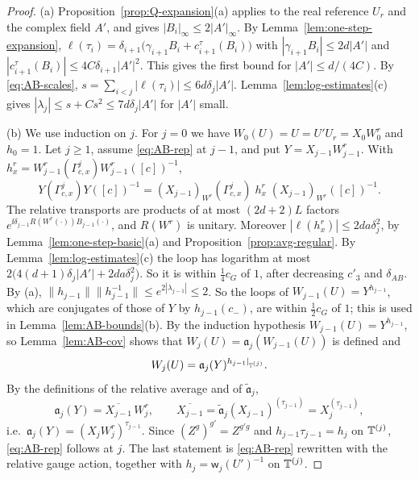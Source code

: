 \begin{proof}
(a) Proposition~\ref{prop:Q-expansion}(a) applies to the real reference $U_r$ and the complex field $A'$, and gives $|B_i|_\infty\le2|A'|_\infty$. By Lemma~\ref{lem:one-step-expansion}, $\ell(\tau_i)=\delta_{i+1}\big(\gamma_{i+1}B_i+c^\tau_{i+1}(B_i)\big)$ with $|\gamma_{i+1}B_i|\le2d|A'|$ and $|c^\tau_{i+1}(B_i)|\le4C\delta_{i+1}|A'|^2$. This gives the first bound for $|A'|\le d/(4C)$. By \eqref{eq:AB-scales}, $s=\sum_{i<j}|\ell(\tau_i)|\le6d\delta_j|A'|$. Lemma~\ref{lem:log-estimates}(c) gives $|\lambda_j|\le s+Cs^2\le7d\delta_j|A'|$ for $|A'|$ small.

(b) We use induction on $j$. For $j=0$ we have $W_0(U)=U=U'U_r=X_0W^r_0$ and $h_0=1$. Let $j\ge1$, assume \eqref{eq:AB-rep} at $j-1$, and put $Y=X_{j-1}W^r_{j-1}$. With $h^r_x=W^r_{j-1}(\Gamma^j_{c,x})W^r_{j-1}([c])^{-1}$,
\[
Y(\Gamma^j_{c,x})Y([c])^{-1}=(X_{j-1})_{W^r}(\Gamma^j_{c,x})\;h^r_x\;(X_{j-1})_{W^r}([c])^{-1}.
\]
The relative transports are products of at most $(2d+2)L$ factors $e^{\ii\delta_{j-1}R(W^r(\cdot))B_{j-1}(\cdot)}$, and $R(W^r)$ is unitary. Moreover $|\ell(h^r_x)|\le2da\delta_j^2$, by Lemma~\ref{lem:one-step-basic}(a) and Proposition~\ref{prop:avg-regular}. By Lemma~\ref{lem:log-estimates}(c) the loop has logarithm at most $2\big(4(d+1)\delta_j|A'|+2da\delta_j^2\big)$. So it is within $\frac14c_G$ of $1$, after decreasing $c'_3$ and $\delta_{AB}$. By (a), $\|h_{j-1}\|\|h_{j-1}^{-1}\|\le e^{2|\lambda_{j-1}|}\le2$. So the loops of $W_{j-1}(U)=Y^{h_{j-1}}$, which are conjugates of those of $Y$ by $h_{j-1}(c_-)$, are within $\frac12c_G$ of $1$; this is used in Lemma~\ref{lem:AB-bounds}(b). By the induction hypothesis $W_{j-1}(U)=Y^{h_{j-1}}$, so Lemma~\ref{lem:AB-cov} shows that $W_j(U)=\mathfrak a_j(W_{j-1}(U))$ is defined and
\[
W_j(U)=\mathfrak a_j(Y)^{h_{j-1}|_{\mathbb T^{(j)}}} .
\]
By the definitions of the relative average and of $\tilde{\mathfrak a}_j$,
\[
\mathfrak a_j(Y)=\overline{X_{j-1}}\,W^r_j,\qquad \overline{X_{j-1}}=\tilde{\mathfrak a}_j(X_{j-1})^{(\tau_{j-1})}=X_j^{(\tau_{j-1})},
\]
i.e.\ $\mathfrak a_j(Y)=(X_jW^r_j)^{\tau_{j-1}}$. Since $(Z^g)^{g'}=Z^{g'g}$ and $h_{j-1}\tau_{j-1}=h_j$ on $\mathbb T^{(j)}$, \eqref{eq:AB-rep} follows at $j$. The last statement is \eqref{eq:AB-rep} rewritten with the relative gauge action, together with $h_j=\mathsf w_j(U')^{-1}$ on $\mathbb T^{(j)}$.
\end{proof}


